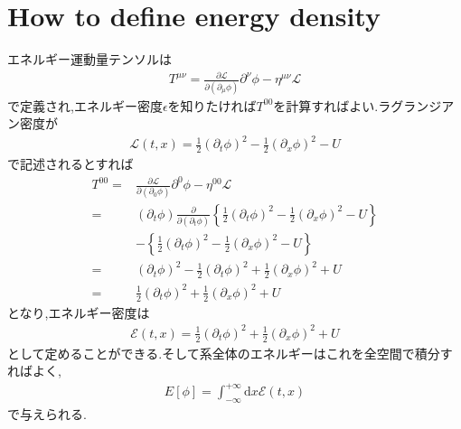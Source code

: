\documentclass[dvipdfmx,11pt,a4paper,oneside,openany]{jsbook}
\begin{document}
\chapter{How to define energy density}
エネルギー運動量テンソルは
\begin{align*}
    T^{\mu \nu}=\frac{\partial \mathcal{L}}{\partial\left(\partial_{\mu} \phi\right)} \partial^{\nu} \phi-\eta^{\mu \nu} \mathcal{L}
\end{align*}
で定義され,エネルギー密度$\epsilon$を知りたければ$T^{00}$を計算すればよい.ラグランジアン密度が
\begin{align*}
    \mathcal{L}(t,x)=\frac{1}{2}\left(\partial_{t} \phi\right)^{2}-\frac{1}{2}\left(\partial_{x} \phi\right)^{2}-U
\end{align*}
で記述されるとすれば
\begin{align*}
    T^{00}= & \frac{\partial \mathcal{L}}{\partial\left(\partial_{0} \phi\right)} \partial^{0} \phi-\eta^{00} \mathcal{L}                                                                                        \\
    =       & \left(\partial_{t} \phi\right) \frac{\partial}{\partial\left(\partial_{t} \phi\right)}\left\{\frac{1}{2}\left(\partial_{t} \phi\right)^{2}-\frac{1}{2}\left(\partial_{x} \phi\right)^{2}-U\right\} \\
            & -\left\{\frac{1}{2}\left(\partial_{t} \phi\right)^{2}-\frac{1}{2}\left(\partial_{x} \phi\right)^{2}-U\right\}                                                                                      \\
    =       & \left(\partial_{t} \phi\right)^{2}-\frac{1}{2}\left(\partial_{t} \phi\right)^{2}+\frac{1}{2}\left(\partial_{x} \phi\right)^{2}+U                                                                   \\
    =       & \frac{1}{2}\left(\partial_{t} \phi\right)^{2}+\frac{1}{2}\left(\partial_{x} \phi\right)^{2}+U
\end{align*}
となり,エネルギー密度は
\begin{align*}
    \mathcal{E}(t, x)=\frac{1}{2}\left(\partial_{t} \phi\right)^{2}+\frac{1}{2}\left(\partial_{x} \phi\right)^{2}+U
\end{align*}
として定めることができる.そして系全体のエネルギーはこれを全空間で積分すればよく,
\begin{align*}
    E[\phi]=\int_{-\infty}^{+\infty} \mathrm{d} x \mathcal{E}(t, x)
\end{align*}
で与えられる.
\end{document}
